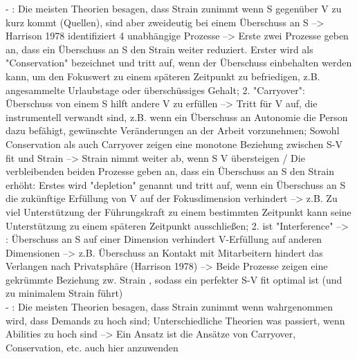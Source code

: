 - \cite[S. 3]{edwards:1996}: Die meisten Theorien besagen, dass Strain zunimmt wenn S gegenüber V zu kurz kommt (Quellen), sind aber zweideutig bei einem Überschuss an S --> Harrison 1978 identifiziert 4 unabhängige Prozesse --> Erste zwei Prozesse geben an, dass ein Überschuss an S den Strain weiter reduziert. Erster wird als "Conservation" bezeichnet und tritt auf, wenn der Überschuss einbehalten werden kann, um den Fokuswert zu einem späteren Zeitpunkt zu befriedigen, z.B. angesammelte Urlaubstage oder überschüssiges Gehalt; 2. "Carryover": Überschuss von einem S hilft andere V zu erfüllen --> Tritt für V auf, die instrumentell verwandt sind, z.B. wenn ein Überschuss an Autonomie die Person dazu befähigt, gewünschte Veränderungen an der Arbeit vorzunehmen; Sowohl Conservation als auch Carryover zeigen eine monotone Beziehung zwischen S-V fit und Strain --> Strain nimmt weiter ab, wenn S V übersteigen / Die verbleibenden beiden Prozesse geben an, dass ein Überschuss an S den Strain erhöht: Erstes wird "depletion" genannt und tritt auf, wenn ein Überschuss an S die zukünftige Erfüllung von V auf der Fokusdimension verhindert --> z.B. Zu viel Unterstützung der Führungskraft zu einem bestimmten Zeitpunkt kann seine Unterstützung zu einem späteren Zeitpunkt ausschließen; 2. ist "Interference" --> \cite[S. 4]{edwards:1996}: Überschuss an S auf einer Dimension verhindert V-Erfüllung auf anderen Dimensionen --> z.B. Überschuss an Kontakt mit Mitarbeitern hindert das Verlangen nach Privatsphäre (Harrison 1978) --> Beide Prozesse zeigen eine gekrümmte Beziehung zw. Strain , sodass ein perfekter S-V fit optimal ist (und zu minimalem Strain führt) \\
- \cite[S. 6]{edwards:1996}: Die meisten Theorien besagen, dass Strain zunimmt wenn wahrgenommen wird, dass Demands zu hoch sind; Unterschiedliche Theorien was passiert, wenn Abilities zu hoch sind --> Ein Ansatz ist die Ansätze von Carryover, Conservation, etc. auch hier anzuwenden \\

